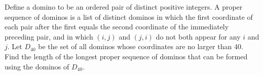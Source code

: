 Define a domino to be an ordered pair of distinct positive integers.  A proper sequence of dominos is a list of distinct dominos in which the first coordinate of each pair after the first equals the second coordinate of the immediately preceding pair, and in which $(i,j)$ and $(j,i)$ do not both appear for any $i$ and $j.$  Let $D_{40}$ be the set of all dominos whose coordinates are no larger than 40.  Find the length of the longest proper sequence of dominos that can be formed using the dominos of $D_{40}.$